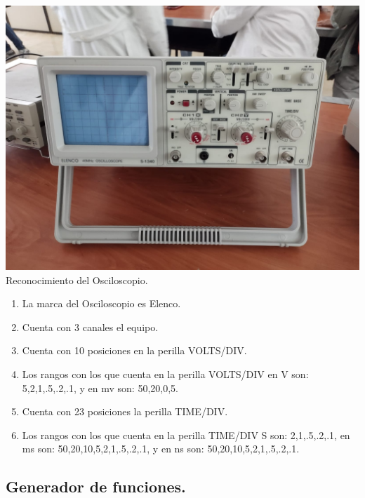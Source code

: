 \documentclass[10pt]{article}
\begin{document}
\begin{multicols}{2}
\begin{center}
\includegraphics[scale=0.1]{Imagenes/osciloscopio.png}\\
Reconocimiento del Osciloscopio.
\begin{enumerate}
\item La marca del Osciloscopio es Elenco.
\item Cuenta con 3 canales el equipo.
\item Cuenta con 10 posiciones en la perilla VOLTS/DIV.
\item Los rangos con los que cuenta en la perilla VOLTS/DIV en V son: 5,2,1,.5,.2,.1, y en mv son: 50,20,0,5.
\item Cuenta con 23 posiciones la perilla TIME/DIV.
\item Los rangos con los que cuenta en la perilla TIME/DIV S son: 2,1,.5,.2,.1, en ms son: 50,20,10,5,2,1,.5,.2,.1, y en ns son: 50,20,10,5,2,1,.5,.2,.1.
\end{enumerate}
\end{center}

\subsection{Generador de funciones.}


\end{multicols}
\end{document}
